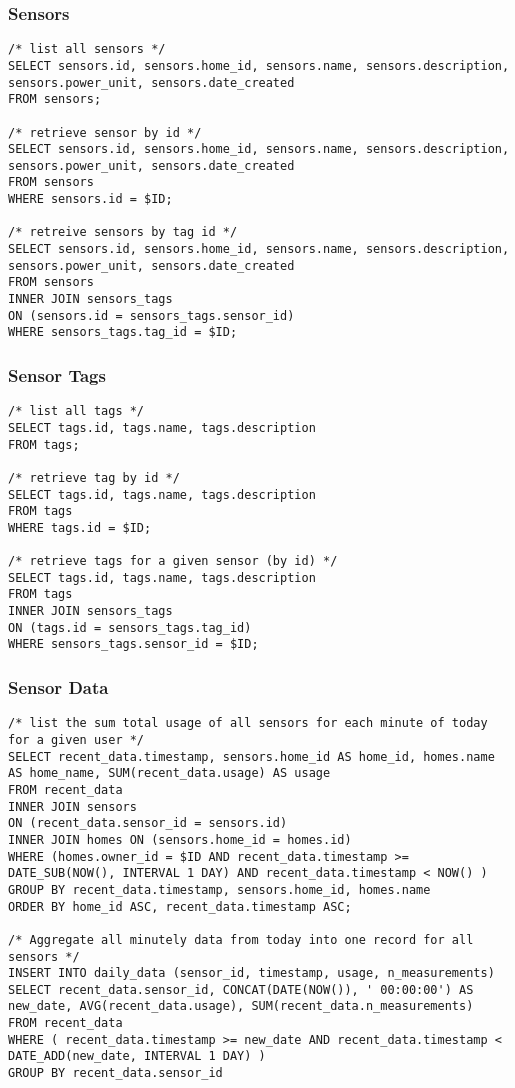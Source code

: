 \documentclass[11pt]{article}
\begin{document}
  \subsubsection{Sensors}
\begin{lstlisting}[style=SQL]
/* list all sensors */
SELECT sensors.id, sensors.home_id, sensors.name, sensors.description, sensors.power_unit, sensors.date_created
FROM sensors;

/* retrieve sensor by id */
SELECT sensors.id, sensors.home_id, sensors.name, sensors.description, sensors.power_unit, sensors.date_created
FROM sensors
WHERE sensors.id = $ID;

/* retreive sensors by tag id */
SELECT sensors.id, sensors.home_id, sensors.name, sensors.description, sensors.power_unit, sensors.date_created
FROM sensors
INNER JOIN sensors_tags
ON (sensors.id = sensors_tags.sensor_id)
WHERE sensors_tags.tag_id = $ID;
\end{lstlisting}

  \subsubsection{Sensor Tags}
\begin{lstlisting}[style=SQL]
/* list all tags */
SELECT tags.id, tags.name, tags.description
FROM tags;

/* retrieve tag by id */
SELECT tags.id, tags.name, tags.description
FROM tags
WHERE tags.id = $ID;

/* retrieve tags for a given sensor (by id) */
SELECT tags.id, tags.name, tags.description
FROM tags
INNER JOIN sensors_tags
ON (tags.id = sensors_tags.tag_id)
WHERE sensors_tags.sensor_id = $ID;
\end{lstlisting}

  \subsubsection{Sensor Data}
\begin{lstlisting}[style=SQL]
/* list the sum total usage of all sensors for each minute of today for a given user */
SELECT recent_data.timestamp, sensors.home_id AS home_id, homes.name AS home_name, SUM(recent_data.usage) AS usage
FROM recent_data
INNER JOIN sensors
ON (recent_data.sensor_id = sensors.id)
INNER JOIN homes ON (sensors.home_id = homes.id)
WHERE (homes.owner_id = $ID AND recent_data.timestamp >= DATE_SUB(NOW(), INTERVAL 1 DAY) AND recent_data.timestamp < NOW() )
GROUP BY recent_data.timestamp, sensors.home_id, homes.name
ORDER BY home_id ASC, recent_data.timestamp ASC;

/* Aggregate all minutely data from today into one record for all sensors */
INSERT INTO daily_data (sensor_id, timestamp, usage, n_measurements)
SELECT recent_data.sensor_id, CONCAT(DATE(NOW()), ' 00:00:00') AS new_date, AVG(recent_data.usage), SUM(recent_data.n_measurements)
FROM recent_data
WHERE ( recent_data.timestamp >= new_date AND recent_data.timestamp < DATE_ADD(new_date, INTERVAL 1 DAY) )
GROUP BY recent_data.sensor_id

\end{lstlisting}
\end{document}

